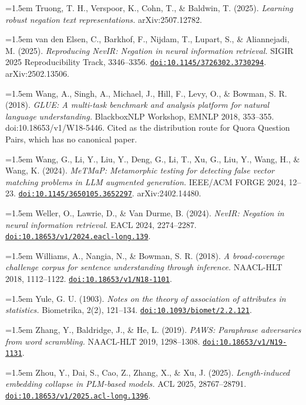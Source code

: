 \documentclass[11pt]{article}
\newcommand{\bibentry}[1]{\par\noindent\hangindent=1.5em\hangafter=1 #1\par\vspace{2pt}}
\newcommand{\doilink}[1]{\href{https://doi.org/#1}{\nolinkurl{doi:#1}}}
\begin{document}
\bibentry{\hypertarget{bib:truong}{}Truong, T. H., Verspoor, K., Cohn, T., \& Baldwin, T. (2025). \emph{Learning robust negation text representations.} arXiv:2507.12782.}
\bibentry{\hypertarget{bib:vandenelsen}{}van den Elsen, C., Barkhof, F., Nijdam, T., Lupart, S., \& Aliannejadi, M. (2025). \emph{Reproducing NevIR: Negation in neural information retrieval.} SIGIR 2025 Reproducibility Track, 3346--3356. \doilink{10.1145/3726302.3730294}. arXiv:2502.13506.}
\bibentry{\hypertarget{bib:wangglue}{}Wang, A., Singh, A., Michael, J., Hill, F., Levy, O., \& Bowman, S. R. (2018). \emph{GLUE: A multi-task benchmark and analysis platform for natural language understanding.} BlackboxNLP Workshop, EMNLP 2018, 353--355. doi:10.18653/v1/W18-5446. Cited as the distribution route for Quora Question Pairs, which has no canonical paper.}
\bibentry{\hypertarget{bib:wangmetmap}{}Wang, G., Li, Y., Liu, Y., Deng, G., Li, T., Xu, G., Liu, Y., Wang, H., \& Wang, K. (2024). \emph{MeTMaP: Metamorphic testing for detecting false vector matching problems in LLM augmented generation.} IEEE/ACM FORGE 2024, 12--23. \doilink{10.1145/3650105.3652297}. arXiv:2402.14480.}
\bibentry{\hypertarget{bib:weller}{}Weller, O., Lawrie, D., \& Van Durme, B. (2024). \emph{NevIR: Negation in neural information retrieval.} EACL 2024, 2274--2287. \doilink{10.18653/v1/2024.eacl-long.139}.}
\bibentry{\hypertarget{bib:williams}{}Williams, A., Nangia, N., \& Bowman, S. R. (2018). \emph{A broad-coverage challenge corpus for sentence understanding through inference.} NAACL-HLT 2018, 1112--1122. \doilink{10.18653/v1/N18-1101}.}
\bibentry{\hypertarget{bib:yule}{}Yule, G. U. (1903). \emph{Notes on the theory of association of attributes in statistics.} Biometrika, 2(2), 121--134. \doilink{10.1093/biomet/2.2.121}.}
\bibentry{\hypertarget{bib:zhang}{}Zhang, Y., Baldridge, J., \& He, L. (2019). \emph{PAWS: Paraphrase adversaries from word scrambling.} NAACL-HLT 2019, 1298--1308. \doilink{10.18653/v1/N19-1131}.}
\bibentry{\hypertarget{bib:zhou}{}Zhou, Y., Dai, S., Cao, Z., Zhang, X., \& Xu, J. (2025). \emph{Length-induced embedding collapse in PLM-based models.} ACL 2025, 28767--28791. \doilink{10.18653/v1/2025.acl-long.1396}.}
\end{document}
